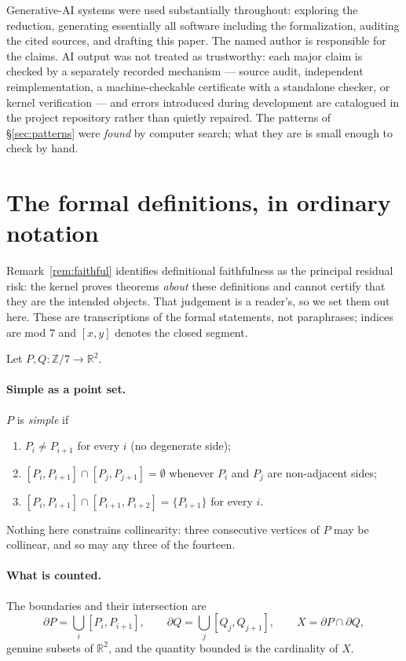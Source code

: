 \documentclass[11pt,a4paper]{article}
\theoremstyle{plain}
\theoremstyle{definition}
\theoremstyle{remark}
\begin{document}
Generative-AI systems were used substantially throughout: exploring the
reduction, generating essentially all software including the formalization,
auditing the cited sources, and drafting this paper. The named author is
responsible for the claims. AI output was not treated as trustworthy: each
major claim is checked by a separately recorded mechanism --- source audit,
independent reimplementation, a machine-checkable certificate with a standalone
checker, or kernel verification --- and errors introduced during development
are catalogued in the project repository rather than quietly repaired. The
patterns of \S\ref{sec:patterns} were \emph{found} by computer search; what they
are is small enough to check by hand.

\appendix

\section{The formal definitions, in ordinary notation}\label{app:defs}

Remark~\ref{rem:faithful} identifies definitional faithfulness as the principal
residual risk: the kernel proves theorems \emph{about} these definitions and
cannot certify that they are the intended objects. That judgement is a reader's,
so we set them out here. These are transcriptions of the formal statements, not
paraphrases; indices are mod $7$ and $[x,y]$ denotes the closed segment.

Let $P,Q:\mathbb{Z}/7\to\mathbb{R}^2$.

\paragraph{Simple as a point set.} $P$ is \emph{simple} if
\begin{enumerate}[label=(S\arabic*),leftmargin=*,nosep]
  \item $P_i \ne P_{i+1}$ for every $i$ \quad(no degenerate side);
  \item $[P_i,P_{i+1}]\cap[P_j,P_{j+1}]=\emptyset$ whenever $P_i$ and $P_j$ are
    non-adjacent sides;
  \item $[P_i,P_{i+1}]\cap[P_{i+1},P_{i+2}]=\{P_{i+1}\}$ for every $i$.
\end{enumerate}
Nothing here constrains collinearity: three consecutive vertices of $P$ may be
collinear, and so may any three of the fourteen.

\paragraph{What is counted.} The boundaries and their intersection are
\[
  \partial P=\bigcup_{i}[P_i,P_{i+1}],\qquad
  \partial Q=\bigcup_{j}[Q_j,Q_{j+1}],\qquad
  X = \partial P\cap\partial Q ,
\]
genuine subsets of $\mathbb{R}^2$, and the quantity bounded is the cardinality
of $X$.
\end{document}
